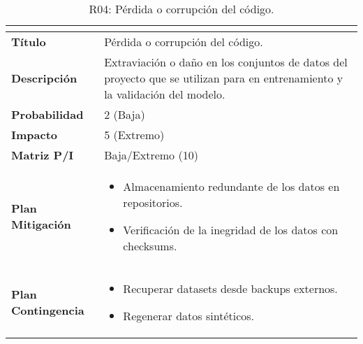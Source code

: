 \begin{table}[H]
\centering
\begin{tabular}{|>{\bfseries}l|p{10cm}|}
\hline
\rowcolor{lightgray}
\multicolumn{2}{|c|}{\textbf{Riesgo R04}} \\ \hline
Título & Pérdida o corrupción del código. \\ \hline
Descripción & Extraviación o daño en los conjuntos de datos del proyecto que se utilizan para en entrenamiento y la validación del modelo.\\ \hline
Probabilidad & 2 (Baja)  \cellcolor{greenrisk}\\ \hline
Impacto & 5 (Extremo) \cellcolor{redrisk}\\ \hline
Matriz P/I & Baja/Extremo (10) \\ \hline
Plan Mitigación & 
\begin{itemize}
\item Almacenamiento redundante de los datos en repositorios.
\item Verificación de la inegridad de los datos con checksums.
\end{itemize} \\ \hline
Plan Contingencia & 
\begin{itemize}
\item Recuperar datasets desde backups externos.
\item Regenerar datos sintéticos.
\end{itemize} \\ \hline
\end{tabular}
\caption{R04: Pérdida o corrupción del código.}
\label{tab:R04}
\end{table}


